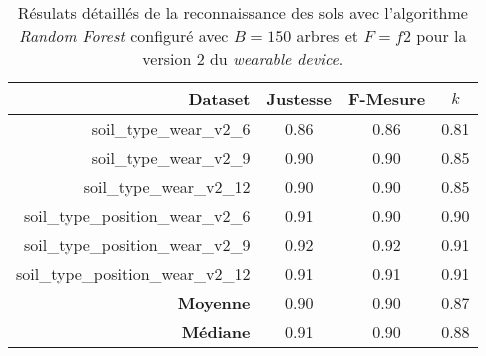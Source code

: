 \begin{table}[H]\renewcommand{\arraystretch}{0.5}
	\centering
	\caption{Résulats détaillés de la reconnaissance des sols avec l'algorithme \textit{Random Forest} configuré avec $B=150$ arbres et $F=f2$ pour la version 2 du \textit{wearable device}.}
	\label{tab:tab:rf-150-f2-wear-v2}
	\begin{tabular}{@{}rccc@{}}
		\toprule
			\textbf{Dataset} & \textbf{Justesse} & \textbf{F-Mesure} & \textbf{$k$} \\
		\midrule
			soil\_type\_wear\_v2\_6 & 0.86 & 0.86 & 0.81 \\
			soil\_type\_wear\_v2\_9 & 0.90 & 0.90 & 0.85 \\
			soil\_type\_wear\_v2\_12 & 0.90 & 0.90 & 0.85 \\
			soil\_type\_position\_wear\_v2\_6 & 0.91 & 0.90 & 0.90 \\
			soil\_type\_position\_wear\_v2\_9 & 0.92 & 0.92 & 0.91 \\
			soil\_type\_position\_wear\_v2\_12 & 0.91 & 0.91 & 0.91 \\
			\textbf{Moyenne} & 0.90 & 0.90 & 0.87 \\
			\textbf{Médiane} & 0.91 & 0.90 & 0.88 \\
		\bottomrule
	\end{tabular}
\end{table}

